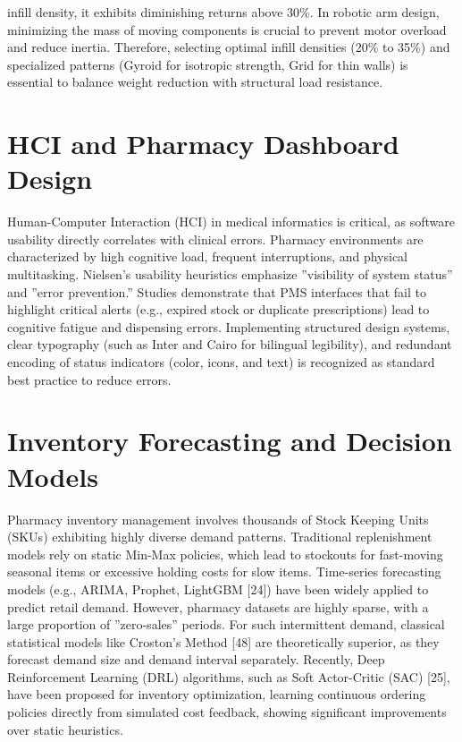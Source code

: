 \documentclass[12pt,a4paper,oneside]{report}
\begin{document}
infill density, it exhibits diminishing returns above 30\%. In robotic
arm design, minimizing the mass of moving components is crucial to
prevent motor overload and reduce inertia. Therefore, selecting optimal
infill densities (20\% to 35\%) and specialized patterns (Gyroid for
isotropic strength, Grid for thin walls) is essential to balance weight
reduction with structural load resistance.

\section{HCI and Pharmacy Dashboard
Design}\label{hci-and-pharmacy-dashboard-design}

Human-Computer Interaction (HCI) in medical informatics is critical, as
software usability directly correlates with clinical errors. Pharmacy
environments are characterized by high cognitive load, frequent
interruptions, and physical multitasking. Nielsen's usability heuristics
emphasize ''visibility of system status'' and ''error prevention.''
Studies demonstrate that PMS interfaces that fail to highlight critical
alerts (e.g., expired stock or duplicate prescriptions) lead to
cognitive fatigue and dispensing errors. Implementing structured design
systems, clear typography (such as Inter and Cairo for bilingual
legibility), and redundant encoding of status indicators (color, icons,
and text) is recognized as standard best practice to reduce errors.

\section{Inventory Forecasting and Decision
Models}\label{inventory-forecasting-and-decision-models}

Pharmacy inventory management involves thousands of Stock Keeping Units
(SKUs) exhibiting highly diverse demand patterns. Traditional
replenishment models rely on static Min-Max policies, which lead to
stockouts for fast-moving seasonal items or excessive holding costs for
slow items. Time-series forecasting models (e.g., ARIMA, Prophet,
LightGBM [24]) have been widely applied to predict retail demand. However,
pharmacy datasets are highly sparse, with a large proportion of
''zero-sales'' periods. For such intermittent demand, classical
statistical models like Croston's Method [48] are theoretically superior, as
they forecast demand size and demand interval separately. Recently,
Deep Reinforcement Learning (DRL) algorithms, such as Soft Actor-Critic
(SAC) [25], have been proposed for inventory optimization, learning
continuous ordering policies directly from simulated cost feedback,
showing significant improvements over static heuristics.
\end{document}
